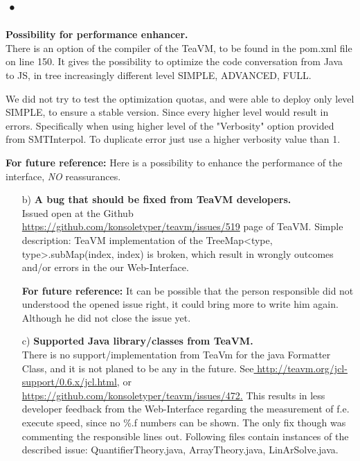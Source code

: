 \documentclass[]{article}
\begin{document}
\subsection{•}  \textbf{Possibility for performance enhancer.} \\
There is an option of the compiler of the TeaVM, to be found in the pom.xml file on line 150. It gives the possibility to optimize the code conversation from Java to JS, in tree increasingly different level SIMPLE, ADVANCED, FULL.

We did not try to test the optimization quotas, and were able to deploy only level SIMPLE, to ensure a stable version.
Since every higher level would result in  errors. Specifically when using higher level of the "Verbosity" option provided from SMTInterpol. To duplicate error just use a higher verbosity value than 1.

\textbf{For future reference:} Here is a possibility to enhance the performance of the interface, \textit{NO} reassurances.   

\begin{itemize}


\item[b)]  \textbf{A bug that should be fixed from TeaVM developers.} \\ Issued open at the Github \href{https://github.com/konsoletyper/teavm/issues/519}{https://github.com/konsoletyper/teavm/issues/519} page of TeaVM. Simple description: TeaVM implementation of the TreeMap<type, type>.subMap(index, index) is broken, which result in wrongly outcomes and/or errors in the our Web-Interface. 

\textbf{For future reference:} It can be possible that the person responsible did not understood the opened issue right, it could bring more to write him again. Although he did not close the issue yet.

\item[c)] \textbf{Supported Java library/classes from TeaVM.} \\ There is no support/implementation from TeaVm for the java Formatter Class, and it is not planed to be any in the future. See\href{http://teavm.org/jcl-support/0.6.x/jcl.html}{ http://teavm.org/jcl-support/0.6.x/jcl.html}, or\href{https://github.com/konsoletyper/teavm/issues/472}{ https://github.com/konsoletyper/teavm/issues/472.} This results in less developer feedback from the Web-Interface regarding the measurement of f.e. execute speed, since no \%.f numbers can be shown. The only fix though was commenting the responsible lines out.
Following files contain instances of the described issue: QuantifierTheory.java, ArrayTheory.java, LinArSolve.java.

\end{itemize}
\end{document}
